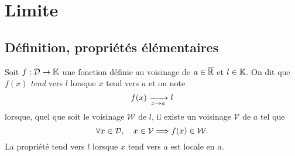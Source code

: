 \documentclass{magnolia}
\begin{document}





\section{Limite}

\subsection{Définition, propriétés élémentaires}


\begin{definition}[utile=-3]
Soit $f:\mathcal{D}\to\mathbb{K}$ une fonction définie au voisinage de $a\in\overline{\mathbb{R}}$ et $l\in\mathbb{K}$.
On dit que $f(x)$ \emph{tend} vers $l$ lorsque $x$ tend vers $a$ et on note
\[f(x)\xrightarrow[x\rightarrow a]{} l\]
lorsque, quel que soit le voisinage $\mathcal{W}$ de $l$, il existe un voisinage
$\mathcal{V}$ de $a$ tel que
\[\forall x\in\mathcal{D},\quad x\in\mathcal{V}\Longrightarrow f(x)\in\mathcal{W}.\]
La propriété \og tend vers $l$ lorsque $x$ tend vers $a$ \fg est locale en $a$.




\end{definition}
\end{document}
